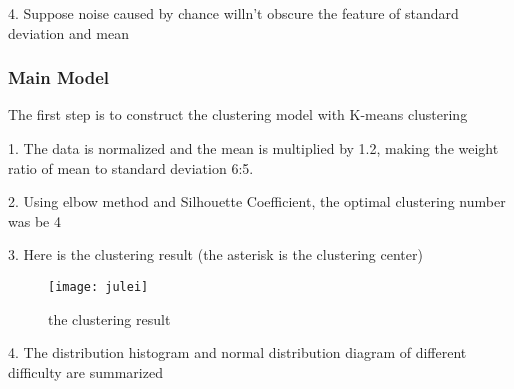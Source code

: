 \documentclass{mcmthesis}
\begin{document}
4. Suppose noise caused by chance willn't obscure the feature of standard
deviation and mean

\subsubsection{Main Model}
The first step is to construct the clustering model with K-means clustering

1. The data is normalized and the mean is multiplied by 1.2, making the weight ratio of
mean to standard deviation 6:5.

2. Using elbow method and Silhouette Coefficient, the optimal clustering number was
 be 4

\begin{figure}[htbp]
\centering    %
\caption{} %
\label{fig:1}  %
\end{figure}

3. Here is the clustering result (the asterisk is the clustering center)

\begin{figure}[h]
\small
\centering
\texttt{[image: julei]}
\caption{the clustering result} \label{fig:aa}
\end{figure}

4. The distribution histogram and normal distribution diagram of different difficulty are
summarized

\begin{figure}[htbp]
\centering    %
\subfigure[Simple] %
{\begin{minipage}{7cm}
\centering          %
\texttt{[image: 22]}   %
\end{minipage}
}	
\subfigure [Ordinary] %
{\begin{minipage}{7cm}
\centering      %
\texttt{[image: 11]}   %
\end{minipage}
}
\subfigure [Difficult] %
{\begin{minipage}{7cm}
\centering      %
\texttt{[image: 33]}   %
\end{minipage}
}
\caption{} %
\label{fig:1}  %
\end{figure}
\end{document}
